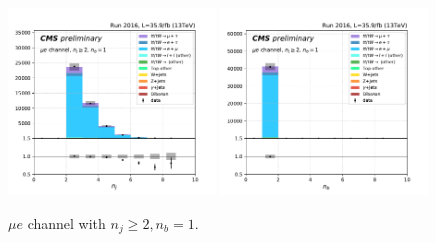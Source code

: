 \begin{figure}[ht]
    \includegraphics[width=0.49\textwidth]{chapters/Appendix/sectionPlots/figures/kinematics_pickles/emu/1b/emu_1b_nJets.pdf}
    \includegraphics[width=0.49\textwidth]{chapters/Appendix/sectionPlots/figures/kinematics_pickles/emu/1b/emu_1b_nBJets.pdf}
    
    \caption{$\mu e$ channel with $n_j\geq2, n_b=1$.}
\end{figure}

